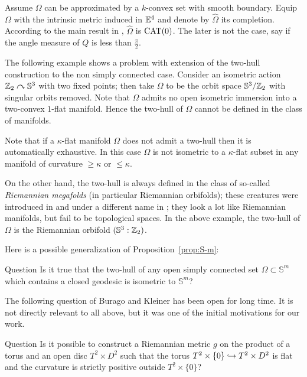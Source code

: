 \documentclass[oneside,a4paper]{article}
\begin{document}
Assume $\Omega$ can be approximated
 by a $k$-convex set with smooth boundary.
Equip $\Omega$ with the intrinsic metric induced in $\mathbb{E}^4$
and denote by $\hat\Omega$ its completion. 
According to the main result in \cite{ABB}, 
$\hat\Omega$ is $\mathrm{CAT}(0)$. 
The later is not the case, say if the angle measure of $Q$ is less than $\tfrac\pi2$.

The following example shows a problem with extension of the
two-hull construction to the  non simply connected case.
Consider an isometric action $\mathbb{Z}_2\curvearrowright\mathbb S^3$ with two fixed points;
then take $\Omega$ to be the orbit space $\mathbb S^3/\mathbb{Z}_2$ with singular orbits removed.
Note that $\Omega$ admits no open isometric immersion into a two-convex $1$-flat manifold.
Hence the two-hull of $\Omega$ cannot be defined in the class of manifolds.

Note that if a $\kappa$-flat manifold $\Omega$ does not admit a two-hull then
it is automatically exhaustive. In this case %
$\Omega$ is not isometric to a $\kappa$-flat subset in any manifold of curvature $\ge \kappa$ or $\le \kappa$.

On the other hand, the two-hull is always defined in the class of so-called \emph{Riemannian megafolds} (in particular Riemannian orbifolds);
these creatures were introduced in \cite{petrunin-tuschmann} and under a different name in  \cite{lott};
they look a lot like Riemannian manifolds,
but fail to be topological spaces.
In the above example, the two-hull of $\Omega$ is the Riemannian orbifold $(\mathbb S^3:\mathbb{Z}_2)$. 

Here is a possible generalization of Proposition~\ref{prop:S-m}:

\begin{thm}{Question}
 Is it true that the two-hull of any open simply connected set $\Omega\subset\mathbb S^m$ which contains a closed geodesic is isometric to $\mathbb S^m$?
\end{thm}



The following question of Burago and Kleiner has been open for long time.
It is not directly relevant to all above,
but it was one of the initial motivations for our work.

\begin{thm}{Question}
Is it possible to construct a Riemannian metric $g$ on the product of a
torus and an open disc $T^2\times D^2$
such that the torus $T^2\times \{0\}\z\hookrightarrow T^2\times D^2$ is flat
and the curvature is strictly positive outside $T^2\times \{0\}$?
\end{thm}
\end{document}

